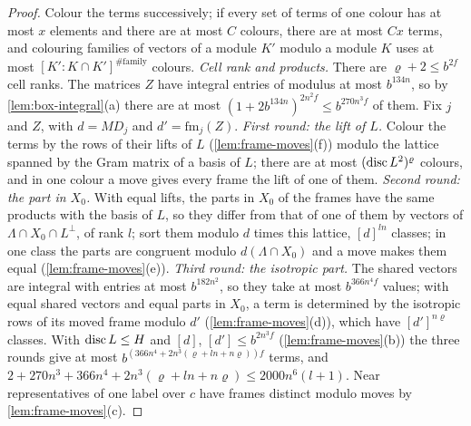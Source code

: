 \begin{proof}
Colour the terms successively; if every set of terms of one colour has at most $x$ elements and there are at most $C$ colours, there are at most $Cx$ terms, and colouring families of vectors of a module $K'$ modulo a module $K$
uses at most $[K':K\cap K']^{\#\text{family}}$ colours. \emph{Cell rank and products.} There are $\varrho+2\le b^{2f}$ cell ranks. The matrices $Z$ have integral entries of modulus at most $b^{134n}$, so by \cref{lem:box-integral}(a) there are
at most $(1+2b^{134n})^{2n^2f}\le b^{270n^3f}$ of them. Fix $j$ and $Z$, with $d=MD_j$ and $d'=\mathrm{fm}_j(Z)$. \emph{First round: the lift of $L$.} Colour the terms by the rows of their lifts of $L$ (\cref{lem:frame-moves}(f)) modulo the
lattice spanned by the Gram matrix of a basis of $L$; there are at most $(\operatorname{disc} L^2)^\varrho$ colours, and in one colour a move gives every frame the lift of one of them. \emph{Second round: the part in $X_0$.} With equal
lifts, the parts in $X_0$ of the frames have the same products with the basis of $L$, so they differ from that of one of them by vectors of $\Lambda\cap X_0\cap L^\perp$, of rank $l$; sort them modulo $d$ times this lattice,
$[d]^{ln}$ classes; in one class the parts are congruent modulo $d(\Lambda\cap X_0)$ and a move makes them equal (\cref{lem:frame-moves}(e)). \emph{Third round: the isotropic part.} The shared vectors are integral with entries at most
$b^{182n^2}$, so they take at most $b^{366n^4f}$ values; with equal shared vectors and equal parts in $X_0$, a term is determined by the isotropic rows of its moved frame modulo $d'$ (\cref{lem:frame-moves}(d)), which have
$[d']^{n\varrho}$ classes. With $\operatorname{disc} L\le H$ and $[d]$, $[d']\le b^{2n^3f}$ (\cref{lem:frame-moves}(b)) the three rounds give at most $b^{(366n^4+2n^3(\varrho+ln+n\varrho))f}$ terms, and
$2+270n^3+366n^4+2n^3(\varrho+ln+n\varrho)\le2000n^6(l+1)$. Near representatives of one label over $c$ have frames distinct modulo moves by \cref{lem:frame-moves}(c).
\end{proof}

